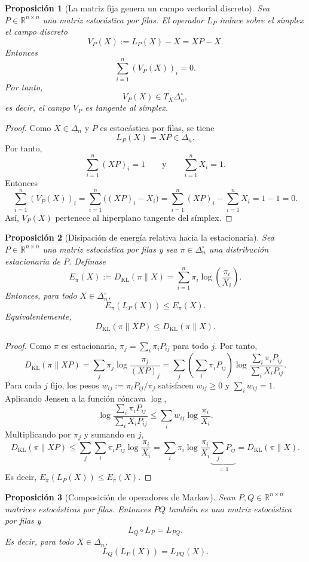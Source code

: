 \documentclass[12pt]{article}
\newtheorem{proposicion}{Proposición}[section]
\begin{document}
\begin{proposicion}[La matriz fija genera un campo vectorial discreto]
Sea \(P\in\mathbb{R}^{n\times n}\) una matriz estocástica por filas. El operador
\(L_P\) induce sobre el símplex el campo discreto
\[
V_P(X):=L_P(X)-X=XP-X.
\]
Entonces
\[
\sum_{i=1}^n (V_P(X))_i=0.
\]
Por tanto,
\[
V_P(X)\in T_X\Delta_n^\circ,
\]
es decir, el campo \(V_P\) es tangente al símplex.
\end{proposicion}

\begin{proof}
Como \(X\in\Delta_n\) y \(P\) es estocástica por filas, se tiene
\[
L_P(X)=XP\in\Delta_n.
\]
Por tanto,
\[
\sum_{i=1}^n (XP)_i=1
\qquad\text{y}\qquad
\sum_{i=1}^n X_i=1.
\]
Entonces
\[
\sum_{i=1}^n (V_P(X))_i
=
\sum_{i=1}^n \bigl((XP)_i-X_i\bigr)
=
\sum_{i=1}^n (XP)_i-\sum_{i=1}^n X_i
=
1-1
=
0.
\]
Así, \(V_P(X)\) pertenece al hiperplano tangente del símplex.
\end{proof}

\begin{proposicion}[Disipación de energía relativa hacia la estacionaria]
Sea \(P\in\mathbb{R}^{n\times n}\) una matriz estocástica por filas y sea
\(\pi\in\Delta_n^\circ\) una distribución estacionaria de \(P\). Defínase
\[
E_\pi(X):=D_{\mathrm{KL}}(\pi\|X)
=
\sum_{i=1}^n \pi_i\log\left(\frac{\pi_i}{X_i}\right).
\]
Entonces, para todo \(X\in\Delta_n^\circ\),
\[
E_\pi(L_P(X))\leq E_\pi(X).
\]
Equivalentemente,
\[
D_{\mathrm{KL}}(\pi\|XP)
\leq
D_{\mathrm{KL}}(\pi\|X).
\]
\end{proposicion}
\begin{proof}
Como $\pi$ es estacionaria, $\pi_j=\sum_i \pi_i P_{ij}$ para todo $j$. Por tanto,
\[
D_{\mathrm{KL}}(\pi\|XP)
=
\sum_j \pi_j \log\frac{\pi_j}{(XP)_j}
=
\sum_j \left(\sum_i \pi_i P_{ij}\right)
\log\frac{\sum_i \pi_i P_{ij}}{\sum_i X_i P_{ij}}.
\]
Para cada $j$ fijo, los pesos $w_{ij}:=\pi_i P_{ij}/\pi_j$ satisfacen
$w_{ij}\geq 0$ y $\sum_i w_{ij}=1$. Aplicando Jensen a la función cóncava $\log$,
\[
\log\frac{\sum_i \pi_i P_{ij}}{\sum_i X_i P_{ij}}
\leq
\sum_i w_{ij}\log\frac{\pi_i}{X_i}.
\]
Multiplicando por $\pi_j$ y sumando en $j$,
\[
D_{\mathrm{KL}}(\pi\|XP)
\leq
\sum_j\sum_i \pi_i P_{ij}\log\frac{\pi_i}{X_i}
=
\sum_i \pi_i\log\frac{\pi_i}{X_i}
\underbrace{\sum_j P_{ij}}_{=1}
=
D_{\mathrm{KL}}(\pi\|X).
\]
Es decir, $E_\pi(L_P(X))\leq E_\pi(X)$.
\end{proof}

\begin{proposicion}[Composición de operadores de Markov]
Sean \(P,Q\in\mathbb{R}^{n\times n}\) matrices estocásticas por filas. Entonces \(PQ\)
también es una matriz estocástica por filas y
\[
L_Q\circ L_P=L_{PQ}.
\]
Es decir, para todo \(X\in\Delta_n\),
\[
L_Q(L_P(X))=L_{PQ}(X).
\]
\end{proposicion}
\end{document}
